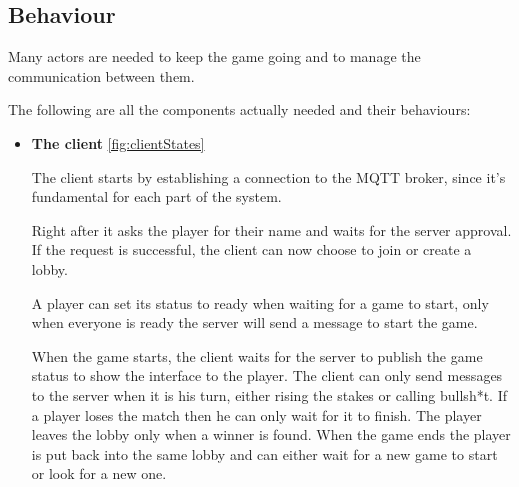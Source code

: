 \documentclass{scrartcl}
\begin{document}
\subsection{Behaviour}\label{behaviour}

Many actors are needed to keep the game going and to manage the communication between them.

The following are all the components actually needed and their behaviours:
\begin{itemize}
      \item
            \textbf{The client} \cref{fig:clientStates} \par
            The client starts by establishing a connection to the MQTT broker, since it's fundamental
            for each part of the system.

            Right after it asks the player for their name and waits for the server approval.
            If the request is successful, the client can now choose to join or create a lobby.

            A player can set its status to ready when waiting for a game to start, only when everyone is ready
            the server will send a message to start the game.

            When the game starts, the client waits for the server to publish the game status to
            show the interface to the player.
            The client can only send messages to the server when it is his turn, either rising the stakes
            or calling bullsh*t. If a player loses the match then he can only wait for it to finish.
            The player leaves the lobby only when a winner is found. When the game ends the
            player is put back into the same lobby and can either wait for a new game to start or look for a new one.


\end{itemize}
\end{document}
